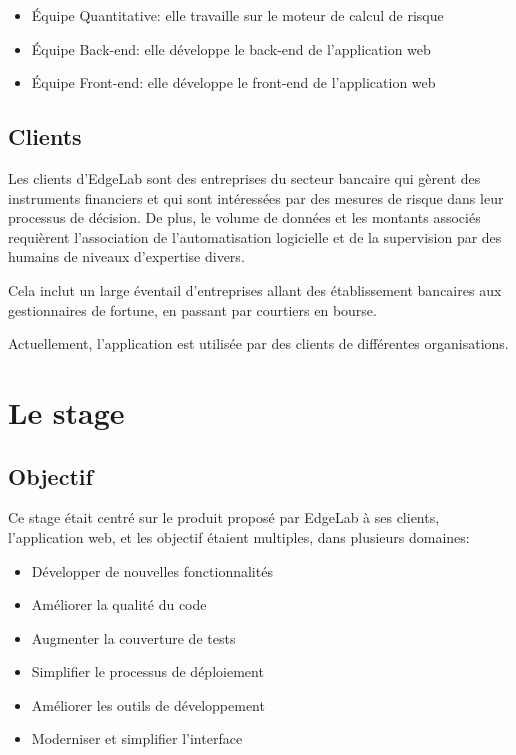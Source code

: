 \documentclass[a4paper,french,12pt]{article}
\begin{document}
	\begin{itemize}
	\item \'Equipe Quantitative: elle travaille sur le moteur de calcul de risque
	\item \'Equipe Back-end: elle développe le back-end de l'application web
	\item \'Equipe Front-end: elle développe le front-end de l'application web
	\end{itemize}

	\subsection{Clients}

		Les clients d'EdgeLab sont des entreprises du secteur bancaire qui gèrent des instruments financiers et qui sont intéressées par des mesures de risque dans leur processus de décision. De plus, le volume de données et les montants associés requièrent l'association de l'automatisation logicielle et de la supervision par des humains de niveaux d'expertise divers.
		
	Cela inclut un large éventail d'entreprises allant des établissement bancaires aux gestionnaires de fortune, en passant par courtiers en bourse.
	
	Actuellement, l'application est utilisée par des clients de différentes organisations. 

\section{Le stage}

	\subsection{Objectif}

		Ce stage était centré sur le produit proposé par EdgeLab à ses clients, l'application web, et les objectif étaient multiples, dans plusieurs domaines:
		
	\begin{itemize}
		\item Développer de nouvelles fonctionnalités
		\item Améliorer la qualité du code
		\item Augmenter la couverture de tests
		\item Simplifier le processus de déploiement
		\item Améliorer les outils de développement
		\item Moderniser et simplifier l'interface
	\end{itemize}			
\end{document}

